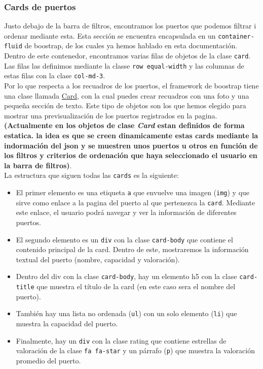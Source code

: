\documentclass{article}
\begin{document}
\subsubsection{Cards de puertos}
Justo debajo de la barra de filtros, encontramos los puertos que podemos filtrar i ordenar mediante esta. Esta sección se encuentra encapsulada en un \texttt{container-fluid} de boostrap, de los cuales ya hemos hablado en esta documentación. Dentro de este contenedor, encontramos varias filas de objetos de la clase \texttt{card}. Las filas las definimos mediante la classe \texttt{row equal-width} y las columnas de estas filas con la clase \texttt{col-md-3}.\\

\noindent Por lo que respecta a los recuadros de los puertos, el framework de boostrap tiene una clase llamada \href{https://getbootstrap.com/docs/5.3/components/card/}{Card}, con la cual puedes crear recuadros con una foto y una pequeña sección de texto. Este tipo de objetos son los que hemos elegido para mostrar una previsualización de los puertos registrados en la pagina. \textbf{(Actualmente en los objetos de clase \textit{Card} estan definidos de forma estatica. la idea es que se creen dinamicamente estas cards mediante la indormación del json y se muestren unos puertos u otros en función de los filtros y criterios de ordenación que haya seleccionado el usuario en la barra de filtros)}.\\

\noindent La estructura que siguen todas las \texttt{cards} es la siguiente:
\begin{itemize}
    \item El primer elemento es una etiqueta \texttt{a} que envuelve una imagen (\texttt{img}) y que sirve como enlace a la pagina del puerto al que pertenezca la \texttt{card}. Mediante este enlace, el usuario podrá navegar y ver la información de diferentes puertos.
    \item El segundo elemento es un \texttt{div} con la clase \texttt{card-body} que contiene el contenido principal de la card. Dentro de este, mostraremos la información textual del puerto (nombre, capacidad y valoración).
    \item Dentro del div con la clase \texttt{card-body}, hay un elemento h5 con la clase \texttt{card-title} que muestra el título de la card (en este caso sera el nombre del puerto).
    \item También hay una lista no ordenada (\texttt{ul}) con un solo elemento (\texttt{li}) que muestra la capacidad del puerto.
    \item Finalmente, hay un \texttt{div} con la clase rating que contiene estrellas de valoración de la clase \texttt{fa fa-star} y un párrafo (\texttt{p}) que muestra la valoración promedio del puerto.
\end{itemize}
\end{document}
